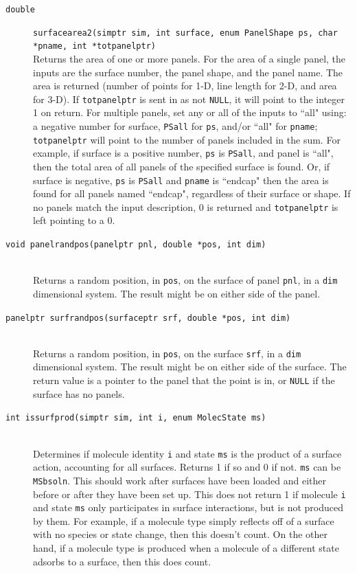 \documentclass {scrbook}
\newcommand {\ttt} {\texttt}
\begin{document}
\begin{description}
\item[\ttt{double}]
\ttt{surfacearea2(simptr sim, int surface, enum PanelShape ps, char *pname, int *totpanelptr)}
\hfill \\
Returns the area of one or more panels. For the area of a single panel, the inputs are the surface number, the panel shape, and the panel name. The area is returned (number of points for 1-D, line length for 2-D, and area for 3-D). If \ttt{totpanelptr} is sent in as not \ttt{NULL}, it will point to the integer 1 on return. For multiple panels, set any or all of the inputs to ``all" using: a negative number for surface, \ttt{PSall} for \ttt{ps}, and/or ``all" for \ttt{pname}; \ttt{totpanelptr} will point to the number of panels included in the sum. For example, if surface is a positive number, \ttt{ps} is \ttt{PSall}, and panel is ``all", then the total area of all panels of the specified surface is found. Or, if surface is negative, \ttt{ps} is \ttt{PSall} and \ttt{pname} is ``endcap" then the area is found for all panels named ``endcap", regardless of their surface or shape. If no panels match the input description, 0 is returned and \ttt{totpanelptr} is left pointing to a 0.

\item[\ttt{void panelrandpos(panelptr pnl, double *pos, int dim)}]
\hfill \\
Returns a random position, in \ttt{pos}, on the surface of panel \ttt{pnl}, in a \ttt{dim} dimensional system. The result might be on either side of the panel.

\item[\ttt{panelptr surfrandpos(surfaceptr srf, double *pos, int dim)}]
\hfill \\
Returns a random position, in \ttt{pos}, on the surface \ttt{srf}, in a \ttt{dim} dimensional system. The result might be on either side of the surface. The return value is a pointer to the panel that the point is in, or \ttt{NULL} if the surface has no panels.

\item[\ttt{int issurfprod(simptr sim, int i, enum MolecState ms)}]
\hfill \\
Determines if molecule identity \ttt{i} and state \ttt{ms} is the product of a surface action, accounting for all surfaces. Returns 1 if so and 0 if not. \ttt{ms} can be \ttt{MSbsoln}. This should work after surfaces have been loaded and either before or after they have been set up. This does not return 1 if molecule \ttt{i} and state \ttt{ms} only participates in surface interactions, but is not produced by them. For example, if a molecule type simply reflects off of a surface with no species or state change, then this doesn't count. On the other hand, if a molecule type is produced when a molecule of a different state adsorbs to a surface, then this does count.


\end{description}
\end{document}
